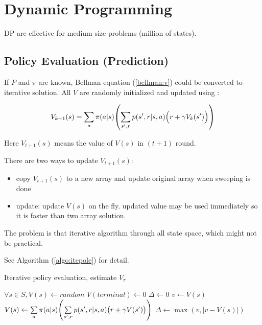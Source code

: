 


\section{Dynamic Programming}

DP are effective for medium size problems (million of states).

\subsection{Policy Evaluation (Prediction)}

If $P$ and $\pi$ are known, Bellman equation (\ref{bellman:v}) could be converted to iterative solution. All $V$ are randomly initialized and updated using :

\begin{equation}
	V_{k+1} (s) = \sum_a \pi (a | s) \mleft ( \sum_{s',r} p(s',r | s,a) \Big ( r + \gamma V_{k}(s') \Big ) \mright )
\end{equation}

Here $V_{t+1}(s)$ means the value of $V(s)$ in $(t+1)$ round.

There are two ways to update $V_{t+1}(s)$:
\begin{itemize}
	\item copy $V_{t+1}(s)$ to a new array and update original array when sweeping is done
	\item {} update: update $V(s)$ on the fly. updated value may be used immediately so it is faster than two array solution.
\end{itemize}


The problem is that iterative algorithm  through all state space, which might not be practical.

See Algorithm (\ref{algo:itepole}) for detail.

\begin{algorithm}
	\caption{Iterative policy evaluation, estimate $V_\pi$}\label{algo:itepole}
	
	\begin{algorithmic}[1]
			\State $\forall s \in S, V(s) \gets random$
			\State $V(terminal) \gets 0$
			\Repeat
				\State $\Delta \gets 0$
					\State $v \gets V(s)$
					\State {}
					\State $V(s) \gets \sum\limits_a \pi (a | s) \mleft ( \sum\limits_{s',r} p(s',r | s,a) \big(r + \gamma V(s') \big ) \mright )$ 
					\State $\Delta \gets \max{}(v, |v - V(s)|)$
				\EndFor
			\Until{$\Delta < \theta$}
		\EndProcedure
	\end{algorithmic}

\end{algorithm}


